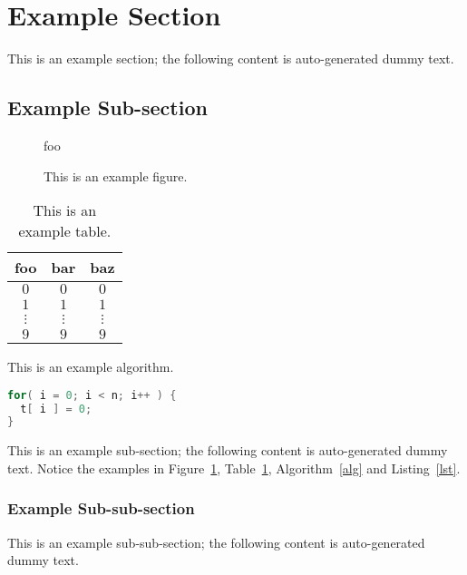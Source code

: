 \documentclass[ %
                    author={Carlos Duran Calle},
                supervisor={Dr. Felipe Campelo},
                    degree={MSc},
                     title={Comparative Machine Learning Analysis for Student Dropout Prediction in a Virtual Learning Environment},
                  subtitle={Incorporating Student Engagement and Socio-Economic Features},
                      type={},
                      year={2025}]{dissertation}
\begin{document}
\section{Example Section}

This is an example section; 
the following content is auto-generated dummy text.
\lipsum

\subsection{Example Sub-section}

\begin{figure}[t]
\centering
foo
\caption{This is an example figure.}
\label{fig}
\end{figure}

\begin{table}[t]
\centering
\begin{tabular}{|cc|c|}
\hline
foo      & bar      & baz      \\
\hline
$0     $ & $0     $ & $0     $ \\
$1     $ & $1     $ & $1     $ \\
$\vdots$ & $\vdots$ & $\vdots$ \\
$9     $ & $9     $ & $9     $ \\
\hline
\end{tabular}
\caption{This is an example table.}
\label{tab}
\end{table}

\begin{algorithm}[t]
\caption{This is an example algorithm.}
\label{alg}
\end{algorithm}

\begin{lstlisting}[float={t},caption={This is an example listing.},label={lst},language=C]
for( i = 0; i < n; i++ ) {
  t[ i ] = 0;
}
\end{lstlisting}

This is an example sub-section;
the following content is auto-generated dummy text.
Notice the examples in Figure~\ref{fig}, Table~\ref{tab}, Algorithm~\ref{alg}
and Listing~\ref{lst}.
\lipsum

\subsubsection{Example Sub-sub-section}

This is an example sub-sub-section;
the following content is auto-generated dummy text.
\lipsum
\end{document}
